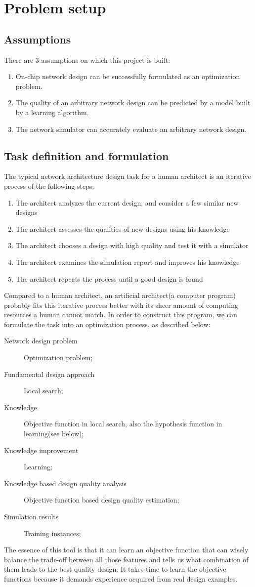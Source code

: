 \documentclass[12pt]{article}
\theoremstyle{definition}
\begin{document}
\section{Problem setup}
\subsection{Assumptions}
There are 3 assumptions on which this project is built:
\begin{enumerate}
\item On-chip network design can be successfully formulated as an optimization problem.
\item The quality of an arbitrary network design can be predicted by a model built by a learning algorithm.
\item The network simulator can accurately evaluate an arbitrary network design.
\end{enumerate}
\subsection{Task definition and formulation}
The typical network architecture design task for a human architect is an iterative process of the following steps:
\begin{enumerate}
\item{The architect analyzes the current design, and consider a few similar new designs}
\item{The architect assesses the qualities of new designs using his knowledge}
\item{The architect chooses a design with high quality and test it with a simulator}
\item{The architect examines the simulation report and improves his knowledge}
\item{The architect repeats the process until a good design is found}
\end{enumerate}
Compared to a human architect, an artificial architect(a computer program) probably fits this iterative process better with its sheer amount of computing resources a human cannot match. In order to construct this program, we can formulate the task into an optimization process, as described below:
\begin{description}
  \item[Network design problem] Optimization problem;
  \item[Fundamental design approach] Local search;
  \item[Knowledge] Objective function in local search, also the hypothesis function in learning(see below);
  \item[Knowledge improvement] Learning;
  \item[Knowledge based design quality analysis] Objective function based design quality estimation;
  \item[Simulation results] Training instances;
\end{description}
The essence of this tool is that it can learn an objective function that can wisely balance the trade-off between all those features and tells us what combination of them leads to the best quality design. It takes time to learn the objective functions because it demands experience acquired from real design examples.
\end{document}
